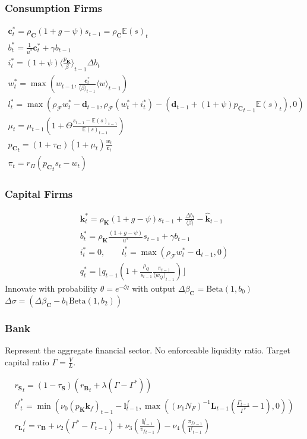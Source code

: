 \documentclass[]{beamer}
\begin{document}
\begin{frame}
	\frametitle{Consumption Firms}
	\vspace{-1em}
	\begin{gather*}
		\mathbf{c}^*_t = \rho_\mathbf{C}(1+g-\psi)s_{t-1} = \rho_\mathbf{C}{\mathbb{E}(s)}_t \\
		b^*_t = \frac{1}{u^*}\mathbf{c}^*_t + \gamma b_{t-1} \\
		i^*_t = (1+\psi){\langle\frac{{p_\mathbf{K}}}{\beta}\rangle}_{t-1}{\Delta b}_t \\
		w_t^* = \max(w_{t-1}, \frac{\mathbf{c}^*_t}{{\langle \beta \rangle}_{t-1}}{\langle w \rangle}_{t-1}) \\
		l_t^* = \max(\rho_\mathcal{F} w_t^* - \mathbf{d}_{t-1}, \rho_\mathcal{F} (w_t^* + i_t^*) - (\mathbf{d}_{t-1} + (1+\psi){p_\mathbf{C}}_{t-1} {\mathbb{E}(s)}_t), 0) \\
		\mu_t = \mu_{t-1}(1 + \Theta \frac{s_{t-1}-{\mathbb{E}(s)}_{t-1}}{{\mathbb{E}(s)}_{t-1}}) \\
		{p_\mathbf{C}}_t = (1+\tau_\mathbf{C})(1+\mu_t)\frac{w_t}{\mathbf{c}_t} \\
		\pi_t = r_\Pi ({p_\mathbf{C}}_t s_t - w_t)
	\end{gather*}
\end{frame}

\begin{frame}
	\frametitle{Capital Firms}
	\begin{gather*}
		\mathbf{k}_t^* = \rho_\mathbf{K}(1+g-\psi)s_{t-1} + \frac{{\Delta b}_t}{\langle \beta \rangle} - \hat{\mathbf{k}}_{t-1} \\
		b^*_t = \rho_\mathbf{K}\frac{(1+g-\psi)}{u^*}s_{t-1} + \gamma b_{t-1} \\
		i^*_t = 0, \qquad l_t^* = \max(\rho_\mathcal{F} w_t^* - \mathbf{d}_{t-1}, 0) \\
		q_t^* = \lfloor q_{t-1} (1+\frac{\rho_Q}{s_{t-1}}\frac{\pi_{t-1}}{{\langle w_Q \rangle}_{t-1}}) \rfloor
	\end{gather*}
	Innovate with probability $\theta = e^{-\zeta q}$ with output $\Delta \beta_\mathbf{C} = \text{Beta}(1, b_0)$ $\Delta \sigma = (\Delta \beta_\mathbf{C} - b_1 \text{Beta}(1, b_2))$

\end{frame}

\begin{frame}
	\frametitle{Bank}
	Represent the aggregate financial sector. No enforceable liquidity ratio. Target capital ratio $\Gamma = \frac{V}{L}$.

	\begin{gather*}
		{r_\mathbf{S}}_t = (1 - \tau_\mathbf{S}) ({r_\mathbf{B}}_t + \lambda(\Gamma - \Gamma^*))\\
		{l^f}^*_t = \min (\nu_0 (p_\mathbf{K}{\mathbf{k}_f})_{t-1} - \mathbf{l}^f_{t-1}, \max((\nu_1 N_F)^{-1} \mathbf{L}_{t-1} (\frac{\Gamma_{t-1}}{\Gamma^*}-1),0)) \\
		{r_\mathbf{L}}^f_t = r_\mathbf{B} + \nu_2 (\Gamma^* - \Gamma_{t-1}) + \nu_3 (\frac{\mathbf{l}^f_{t-1}}{{v_f}_{t-1}}) - \nu_4 (\frac{{\pi_f}_{t-1}}{{\mathbf{l}^f}_{t-1}})
	\end{gather*}
\end{frame}
\end{document}
